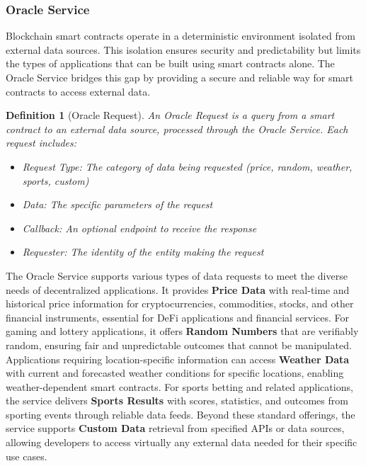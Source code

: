 \documentclass[12pt,a4paper]{article}
\newtheorem{definition}{Definition}
\begin{document}
\subsubsection{Oracle Service}
\label{subsubsec:oracle}

Blockchain smart contracts operate in a deterministic environment isolated from external data sources. This isolation ensures security and predictability but limits the types of applications that can be built using smart contracts alone. The Oracle Service bridges this gap by providing a secure and reliable way for smart contracts to access external data.



\begin{definition}[Oracle Request]
An Oracle Request is a query from a smart contract to an external data source, processed through the Oracle Service. Each request includes:
\begin{itemize}
    \item Request Type: The category of data being requested (price, random, weather, sports, custom)
    \item Data: The specific parameters of the request
    \item Callback: An optional endpoint to receive the response
    \item Requester: The identity of the entity making the request
\end{itemize}
\end{definition}

The Oracle Service supports various types of data requests to meet the diverse needs of decentralized applications. It provides \textbf{Price Data} with real-time and historical price information for cryptocurrencies, commodities, stocks, and other financial instruments, essential for DeFi applications and financial services. For gaming and lottery applications, it offers \textbf{Random Numbers} that are verifiably random, ensuring fair and unpredictable outcomes that cannot be manipulated. Applications requiring location-specific information can access \textbf{Weather Data} with current and forecasted weather conditions for specific locations, enabling weather-dependent smart contracts. For sports betting and related applications, the service delivers \textbf{Sports Results} with scores, statistics, and outcomes from sporting events through reliable data feeds. Beyond these standard offerings, the service supports \textbf{Custom Data} retrieval from specified APIs or data sources, allowing developers to access virtually any external data needed for their specific use cases.
\end{document}
